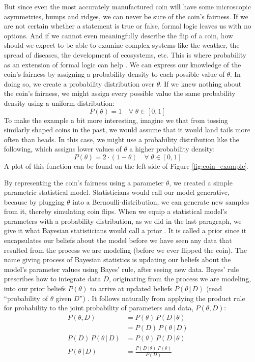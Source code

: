 \documentclass[12pt, a4paper]{report}
\begin{document}
But since even the most accurately manufactured coin will have some microscopic asymmetries, bumps and ridges, we can never be sure of the coin's fairness.
If we are not certain whether a statement is true or false, formal logic leaves us with no options.
And if we cannot even meaningfully describe the flip of a coin, how should we expect to be able to examine complex systems like the weather, the spread of diseases, the development of ecosystems, etc.
This is where probability as an extension of formal logic can help \cite[12]{jaynes}.
We can express our knowledge of the coin's fairness by assigning a probability density to each possible value of $\theta$.
In doing so, we create a probability distribution over $\theta$.
If we knew nothing about the coin's fairness, we might assign every possible value the same probability density using a uniform distribution:
$$
    P(\theta) = 1 \quad \forall \; \theta \in [0,1]
$$
To make the example a bit more interesting, imagine we that from tossing similarly shaped coins in the past, we would assume that it would land tails more often than heads.
In this case, we might use a probability distribution like the following, which assigns lower values of $\theta$ a higher probability density:
$$
    P(\theta) = 2 \cdot (1-\theta) \quad \forall \; \theta \in [0,1]
$$
A plot of this function can be found on the left side of Figure \ref{fig:coin_example}.

By representing the coin's fairness using a parameter $\theta$, we created a simple parametric statistical model.
Statisticians would call our model generative, because by plugging $\theta$ into a Bernoulli-distribution, we can generate new samples from it, thereby simulating coin flips.
When we equip a statistical model's parameters with a probability distribution, as we did in the last paragraph, we give it what Bayesian statisticians would call a prior \cite[34]{mcelreath}.
It is called a prior since it encapsulates our beliefs about the model before we have seen any data that resulted from the process we are modeling (before we ever flipped the coin).
The name giving process of Bayesian statistics is updating our beliefs about the model's parameter values using Bayes' rule, after seeing new data.
Bayes' rule prescribes how to integrate data $D$, originating from the process we are modeling, into our prior beliefs $P(\theta)$ to arrive at updated beliefs $P(\theta \, | \, D)$ (read ``probability of $\theta$ given $D$'') \cite[36]{mcelreath}.
It follows naturally from applying the product rule for probability to the joint probability of parameters and data, $P(\theta, D)$: 
\begin{align}
    P(\theta, D) &= P(\theta) \, P(D \,|\, \theta) \nonumber\\
    &= P(D) \, P(\theta \,|\, D) \nonumber\\
    P(D) \, P(\theta \,|\, D) &= P(\theta) \, P(D \,|\, \theta) \nonumber\\
    P(\theta \, | \, D) &= \frac{P(D \,|\, \theta) \; P(\theta)}{P(D)}
    \label{eq:bayes}
\end{align}
\end{document}

